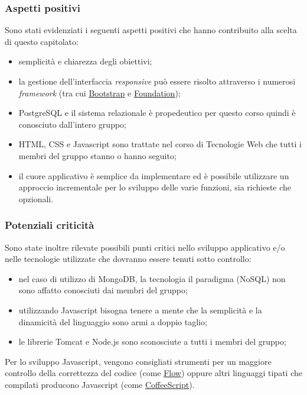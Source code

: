 \documentclass[12pt,a4paper]{article}
\begin{document}
\subsubsection{Aspetti positivi}

Sono stati evidenziati i seguenti aspetti positivi che hanno contribuito alla scelta di questo capitolato:

\begin{itemize}
\item semplicità e chiarezza degli obiettivi;
\item la gestione dell'interfaccia \textit{responsive} può essere risolto attraverso i numerosi \textit{framework} (tra cui \href{http://getbootstrap.com}{Bootstrap} e \href{http://foundation.zurb.com}{Foundation});
\item PostgreSQL e il sistema relazionale è propedeutico per questo corso quindi è conosciuto dall'intero gruppo;
\item HTML, CSS e Javascript sono trattate nel corso di Tecnologie Web che tutti i membri del gruppo stanno o hanno
seguito;
\item il cuore applicativo è semplice da implementare ed è possibile utilizzare un approccio incrementale
per lo sviluppo delle varie funzioni, sia richieste che opzionali.
\end{itemize}

\subsubsection{Potenziali criticità}

Sono state inoltre rilevate possibili punti critici nello sviluppo applicativo e/o nelle tecnologie utilizzate
che dovranno essere tenuti sotto controllo:

\begin{itemize}
\item nel caso di utilizzo di MongoDB, la tecnologia il paradigma (NoSQL) non sono affatto conosciuti dai membri del gruppo;
\item utilizzando Javascript bisogna tenere a mente che la semplicità e la dinamicità del linguaggio sono armi a doppio taglio;
\item le librerie Tomcat e Node.js sono sconosciute a tutti i membri del gruppo;
\end{itemize}
Per lo sviluppo Javascript, vengono consigliati strumenti per un maggiore controllo della correttezza del codice (come \href{http://flowtype.org}{Flow}) oppure altri linguaggi tipati che compilati producono Javascript (come \href{http://coffeescript.org}{CoffeeScript}).
\end{document}
